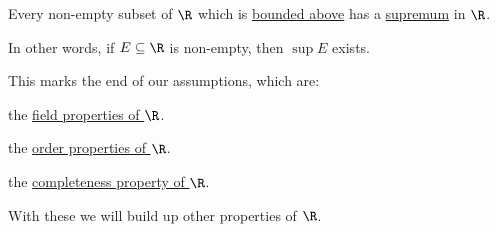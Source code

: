 \label{f330cf9}

Every non-empty subset of $\R$ which is \href{e4698be}{bounded above} has a
\href{e6981e1}{supremum} in $\R$.

In other words, if $E\subseteq\R$ is non-empty, then $\sup E$ exists.

\Remark{}\label{b1dc879}

This marks the end of our assumptions, which are:

\begin{enumerati}
  \item the \href{bf61f02}{field properties of $\R$}.
  \item the \href{d49c63e}{order properties of $\R$}.
  \item the \href{f330cf9}{completeness property of $\R$}.
\end{enumerati}

With these we will build up other properties of $\R$.
